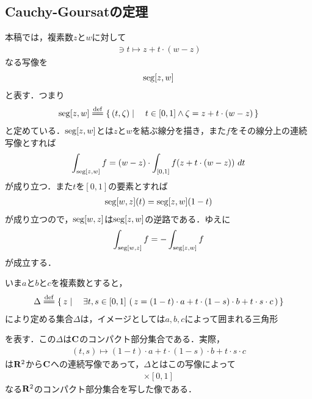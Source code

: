 \subsection{Cauchy-Goursatの定理}
	本稿では，複素数$z$と$w$に対して
	\begin{align}
		[0,1] \ni t \longmapsto z + t \cdot (w - z)
	\end{align}
	なる写像を
	\begin{align}
		\operatorname{seg}[z,w]
	\end{align}
	と表す．つまり
	\begin{align}
		\seg{z}{w} \defeq \Set{(t,\zeta)}{t \in [0,1] \wedge \zeta = z + t \cdot (w - z)}
	\end{align}
	と定めている．$\operatorname{seg}[z,w]$とは$z$と$w$を結ぶ線分を描き，また$f$をその線分上の連続写像とすれば
	\begin{align}
		\int_{\operatorname{seg}[z,w]} f = (w-z) \cdot \int_{[0,1]} f(z + t \cdot (w - z))\ dt
	\end{align}
	が成り立つ．また$t$を$[0,1]$の要素とすれば
	\begin{align}
		\operatorname{seg}[w,z](t) = \operatorname{seg}[z,w](1 - t)
	\end{align}
	が成り立つので，$\operatorname{seg}[w,z]$は$\operatorname{seg}[z,w]$の逆路である．ゆえに
	\begin{align}
		\int_{\operatorname{seg}[w,z]} f = - \int_{\operatorname{seg}[z,w]} f
	\end{align}
	が成立する．
	
	いま$a$と$b$と$c$を複素数とすると，
	\begin{align}
		\Delta \defeq \Set{z}{\exists t,s \in [0,1]\, 
		\left(\, z = (1-t) \cdot a 
		+ t \cdot (1-s) \cdot b 
		+ t \cdot s \cdot c\, \right)}
	\end{align}
	により定める集合$\Delta$は，イメージとしては$a,b,c$によって囲まれる三角形
	
	\begin{center}
	\end{center}
	
	を表す．この$\Delta$は$\mathbf{C}$のコンパクト部分集合である．実際，
	\begin{align}
		(t,s) \longmapsto (1-t) \cdot a + t \cdot (1-s) \cdot b + t \cdot s \cdot c
	\end{align}
	は$\mathbf{R}^2$から$\mathbf{C}$への連続写像であって，$\Delta$とはこの写像によって
	\begin{align}
		[0,1] \times [0,1]
	\end{align}
	なる$\mathbf{R}^2$のコンパクト部分集合を写した像である．
	
